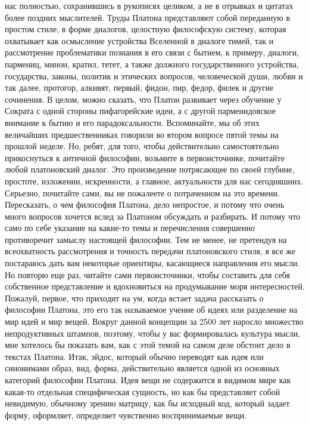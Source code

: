 нас полностью, сохранившись в рукописях целиком, а не в отрывках и цитатах более
поздних мыслителей. Труды Платона представляют собой переданную в простом стиле,
в форме диалогов, целостную философскую систему, которая охватывает как
осмысление устройства Вселенной в диалоге тимей, так и рассмотрение проблематики
познания в его связи с бытием, к примеру, диалоги, пармениц, минон, кратил,
тетет, а также должного государственного устройства, государства, законы,
политик и этических вопросов, человеческой души, любви и так далее, протогор,
алкивят, первый, фидон, пир, федор, филек и другие сочинения. В целом, можно
сказать, что Платон развивает через обучение у Сократа с одной стороны
пифагорейские идеи, а с другой парменидовское внимание к бытию и его
парадоксальности. Вспоминайте, мы об этих величайших предшественниках говорили
во втором вопросе пятой темы на прошлой неделе. Но, ребят, для того, чтобы
действительно самостоятельно прикоснуться к античной философии, возьмите в
первоисточнике, почитайте любой платоновский диалог. Это произведение
потрясающее по своей глубине, простоте, изложении, искренности, а главное,
актуальности для нас сегодняшних. Серьезно, почитайте сами, вы не пожалеете о
потраченном на это времени. Пересказать, о чем философия Платона, дело
непростое, и потому что очень много вопросов хочется вслед за Платоном обсуждать
и разбирать. И потому что само по себе указание на какие-то темы и перечисления
совершенно противоречит замыслу настоящей философии. Тем не менее, не претендуя
на всеохватность рассмотрения и точность передачи платоновского стиля, я все же
постараюсь дать вам некоторые ориентиры, касающиеся направления его мысли. Но
повторю еще раз, читайте сами первоисточники, чтобы составить для себя
собственное представление и вдохновиться на продумывание моря интересностей.
Пожалуй, первое, что приходит на ум, когда встает задача рассказать о философии
Платона, это его так называемое учение об идеях или разделение на мир идей и мир
вещей. Вокруг данной концепции за 2500 лет наросло множество непродуктивных
штампов, поэтому, чтобы у вас формировалась культура мысли, мне хотелось бы
показать вам, как с этой темой на самом деле обстоит дело в текстах Платона.
Итак, эйдос, который обычно переводят как идея или синонимами образ, вид, форма,
действительно является одной из основных категорий философии Платона. Идея вещи
не содержится в видимом мире как какая-то отдельная специфическая сущность, но
как бы представляет собой невидимую, обычному зрению матрицу, как бы исходный
код, который задает форму, оформляет, определяет чувственно воспринимаемые вещи.
